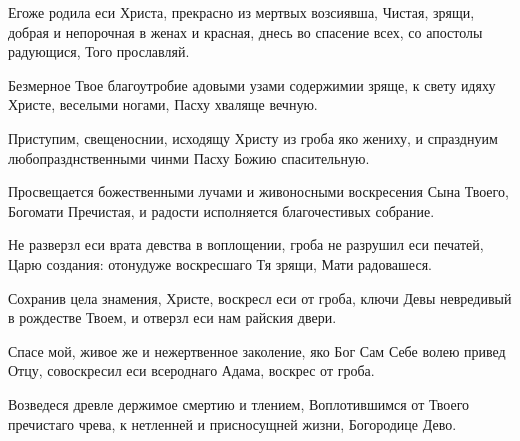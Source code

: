 \begin{mymulticols}
Егоже родила еси Христа, прекрасно из мертвых возсиявша, Чистая, зрящи, добрая и непорочная в женах и красная, днесь во спасение всех, со апостолы радующися, Того прославляй.




Безмерное Твое благоутробие адовыми узами содержимии зряще, к свету идяху Христе, веселыми ногами, Пасху хваляще вечную. 


Приступим, свещеноснии, исходящу Христу из гроба яко жениху, и спразднуим любопразднственными чинми Пасху Божию спасительную. 



Просвещается божественными лучами и живоносными воскресения Сына Твоего, Богомати Пречистая, и радости исполняется благочестивых собрание. 


Не разверзл еси врата девства в воплощении, гроба не разрушил еси печатей, Царю создания: отонудуже воскресшаго Тя зрящи, Мати радовашеся. 




Сохранив цела знамения, Христе, воскресл еси от гроба, ключи Девы невредивый в рождестве Твоем, и отверзл еси нам райския двери. 


Спасе мой, живое же и нежертвенное заколение, яко Бог Сам Себе волею привед Отцу, совоскресил еси всероднаго Адама, воскрес от гроба. 



Возведеся древле держимое смертию и тлением, Воплотившимся от Твоего пречистаго чрева, к нетленней и присносущней жизни, Богородице Дево. 


\end{mymulticols}
